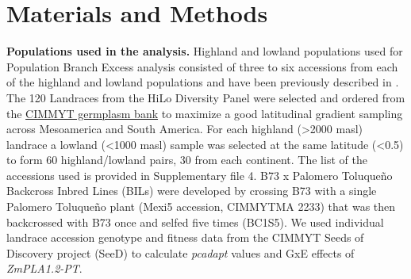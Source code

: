\documentclass[9pt,twocolumn,twoside,lineno]{BioRxiv}
\begin{document}


\section{Materials and Methods}
\label{sec:materials:methods}
\textbf{Populations used in the analysis.} 
Highland and lowland populations used for Population Branch Excess analysis consisted of three to six accessions from each of the highland and lowland populations and have been previously described in \cite{Wang2020-mp, Wang2017-bc}. 
The 120 Landraces from the HiLo Diversity Panel were selected and ordered from the \href{http://mgb.cimmyt.org/gringlobal/search.aspx}{CIMMYT germplasm bank} to maximize a good latitudinal gradient sampling across Mesoamerica and South America. For each highland  (>2000 masl) landrace a lowland (<1000 masl) sample was selected at the same latitude (<0.5\degree) to form 60 highland/lowland pairs, 30 from each continent. 
The list of the accessions used is provided in Supplementary file 4.   
B73 x Palomero Toluqueño Backcross Inbred Lines (BILs) were developed by crossing B73 with a single Palomero Toluqueño plant (Mexi5 accession, CIMMYTMA 2233) that was then backcrossed with B73 once and selfed five times (BC1S5).  
We used  individual landrace accession genotype and fitness data from the CIMMYT Seeds of Discovery project (SeeD) \cite{Gates2019-xu} to calculate \textit{pcadapt} \cite{Luu2017-ws} values and GxE effects of \textit{ZmPLA1.2-PT}.
\end{document}
